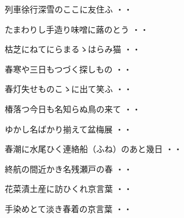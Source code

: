 \vspace{0.6cm}
\begin{shiika}列車徐行深雪のここに友住ふ
\hfill{・・}\end{shiika}
\vspace{0.6cm}
\begin{shiika}たまわりし手造り味噌に蕗のとう
\hfill{・・}\end{shiika}
\vspace{0.6cm}
\begin{shiika}枯芝にねてにらまるゝはらみ猫
\hfill{・・}\end{shiika}
\vspace{0.6cm}
\begin{shiika}春寒や三日もつづく探しもの
\hfill{・・}\end{shiika}
\vspace{0.6cm}
\begin{shiika}春灯失せものこゝに出て笑ふ
\hfill{・・}\end{shiika}
\vspace{0.6cm}
\begin{shiika}椿落つ今日も名知らぬ鳥の来て
\hfill{・・}\end{shiika}
\vspace{0.6cm}
\begin{shiika}ゆかし名ばかり揃えて盆梅展
\hfill{・・}\end{shiika}
\vspace{0.6cm}
\begin{shiika}春潮に水尾ひく連絡船（ふね）のあと幾日
\hfill{・・}\end{shiika}
\vspace{0.6cm}
\begin{shiika}終航の間近かき名残瀬戸の春
\hfill{・・}\end{shiika}
\vspace{0.6cm}
\begin{shiika}花菜漬土産に訪ひくれ京言葉
\hfill{・・}\end{shiika}
\vspace{0.6cm}
\begin{shiika}手染めとて淡き春着の京言葉
\hfill{・・}\end{shiika}
